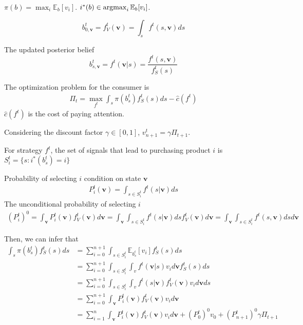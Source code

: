 \documentclass[11pt,a4paper]{article}
\newcommand{\argmax}{\operatornamewithlimits{argmax}}
\begin{document}
$\pi(b)=\max_i\mathbb{E}_b[v_i]$. $i^*(b)\in \argmax_i  \mathbb{E}_b[v_i]$.

$$b^t_{0,\mathbf{v}}=f^t_V(\mathbf{v})=\int_sf^t(s,\mathbf{v})ds$$

The updated posterior belief $$b^t_{s,\mathbf{v}}=f^t(\mathbf{v}|s)=\frac{f^t(s,\mathbf{v})}{f^t_S(s)}$$

The optimization problem for the consumer is
\begin{equation}
    \begin{aligned}
        \Pi_t=\max_{f^t}\int_s \pi(b^t_s)f^t_S(s)ds-\hat{c}(f^t)
    \end{aligned}
    \nonumber
\end{equation}
$\hat{c}(f^t)$ is the cost of paying attention.

Considering the discount factor $\gamma\in[0,1]$, $v_{n+1}^t=\gamma\Pi_{t+1}$.

For strategy $f^t$, the set of signals that lead to purchasing product $i$ is $S^t_i=\{s:i^*(b^t_s)=i\}$

Probability of selecting $i$ condition on state $\mathbf{v}$
\begin{equation}
    \begin{aligned}
        P^t_i(\mathbf{v})=\int_{s\in S^t_i}f^t(s|\mathbf{v})ds
    \end{aligned}
    \nonumber
\end{equation}
The unconditional probability of selecting $i$
\begin{equation}
    \begin{aligned}
        ({P_i^t})^0=\int_{\mathbf{v}}P^t_i(\mathbf{v})f^t_V(\mathbf{v})d\mathbf{v}=\int_{\mathbf{v}}\int_{s\in S^t_i}f^t(s|\mathbf{v})dsf^t_V(\mathbf{v})d\mathbf{v}=\int_{\mathbf{v}}\int_{s\in S^t_i}f^t(s,\mathbf{v})dsd\mathbf{v}
    \end{aligned}
    \nonumber
\end{equation}

Then, we can infer that
\begin{equation}
    \begin{aligned}
        \int_s \pi(b^t_s)f^t_S(s)ds
        &=\sum_{i=0}^{n+1}\int_{s\in S^t_i}\mathbb{E}_{b^t_s}[v_i] f^t_S(s)ds\\
        &=\sum_{i=0}^{n+1}\int_{s\in S^t_i}\int_v f^t(\mathbf{v}|s) v_i d\mathbf{v} f^t_S(s)ds\\
        &=\sum_{i=0}^{n+1}\int_{s\in S^t_i}\int_v f^t(s|\mathbf{v})f^t_V(\mathbf{v}) v_i d\mathbf{v} ds\\
        &=\sum_{i=0}^{n+1}\int_\mathbf{v} P^t_i(\mathbf{v})f^t_V(\mathbf{v}) v_i d\mathbf{v}\\
        &=\sum_{i=1}^{n}\int_\mathbf{v} P^t_i(\mathbf{v})f^t_V(\mathbf{v}) v_i d\mathbf{v}+({P_{0}^t})^0 v_0+({P_{n+1}^t})^0 \gamma\Pi_{t+1}
    \end{aligned}
    \nonumber
\end{equation}
\end{document}

